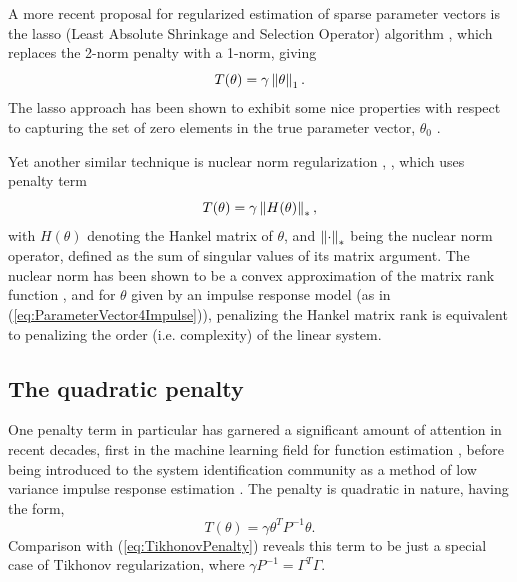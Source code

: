 A more recent proposal for regularized estimation of sparse parameter vectors is the lasso (Least Absolute Shrinkage and Selection Operator) algorithm \cite{Tibshirani1996}, which replaces the 2-norm penalty with a 1-norm, giving
\begin{equation}
T(\theta) = \gamma \left\lVert\theta\right\rVert_1.
\end{equation}
The lasso approach has been shown to exhibit some nice properties with respect to capturing the set of zero elements in the true parameter vector, $\theta_0$ \cite{Tropp2006}. 

Yet another similar technique is nuclear norm regularization \cite{Fazel2001}, \cite{Mohan2010}, which uses penalty term
\begin{equation}
T(\theta) = \gamma \left\lVert H(\theta)\right\rVert_*,
\end{equation}
with $H(\theta)$ denoting the Hankel matrix of $\theta$, and $\left\lVert\cdot\right\rVert_*$ being the nuclear norm operator, defined as the sum of singular values of its matrix argument. The nuclear norm has been shown to be a convex approximation of the matrix rank function \cite{Fazel2001}, and for $\theta$ given by an impulse response model (as in (\ref{eq:ParameterVector4Impulse})), penalizing the Hankel matrix rank is equivalent to penalizing the order (i.e. complexity) of the linear system.

\subsection{The quadratic penalty}

One penalty term in particular has garnered a significant amount of attention in recent decades, first in the machine learning field for function estimation \cite{Rasmussen2006}, before being introduced to the system identification community as a method of low variance impulse response estimation \cite{Pillonetto2010}. The penalty is quadratic in nature, having the form,
\begin{equation}
T(\theta) = \gamma \theta^T P^{-1} \theta.
\label{eq:QuadraticPenaltyT}
\end{equation}
Comparison with (\ref{eq:TikhonovPenalty}) reveals this term to be just a special case of Tikhonov regularization, where $\gamma P^{-1} = \Gamma^T \Gamma$. 

